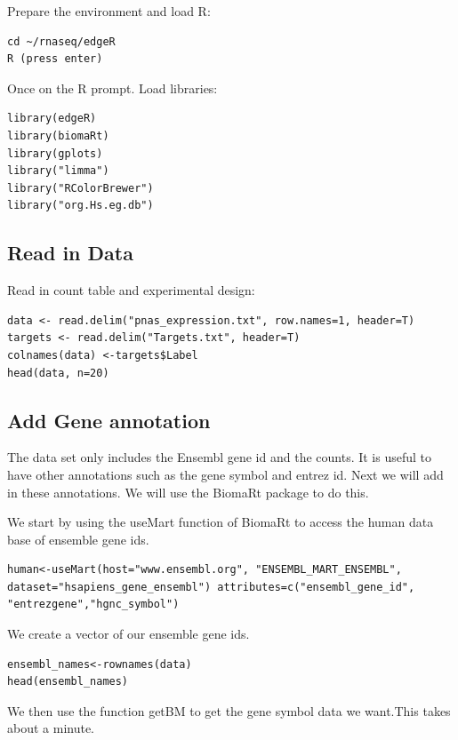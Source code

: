 \begin{steps}
Prepare the environment and load R:
\begin{lstlisting}
cd ~/rnaseq/edgeR
R (press enter)
\end{lstlisting}

Once on the R prompt. Load libraries:
\begin{lstlisting}
library(edgeR)
library(biomaRt)
library(gplots)
library("limma")
library("RColorBrewer")
library("org.Hs.eg.db")
\end{lstlisting}

\subsection{Read in Data}
Read in count table and experimental design:

\begin{steps}
\begin{lstlisting}
data <- read.delim("pnas_expression.txt", row.names=1, header=T)
targets <- read.delim("Targets.txt", header=T)
colnames(data) <-targets$Label
head(data, n=20)
\end{lstlisting}
\end{steps}

\subsection{Add Gene annotation}

The data set only includes the Ensembl gene id and the counts. It is useful to have other annotations such as the gene symbol and entrez id. Next we will add in these annotations.  We will use the BiomaRt package to do this.

\begin{steps}
We start by using the useMart function of BiomaRt to access the human data base of ensemble gene ids.  

\begin{lstlisting}
human<-useMart(host="www.ensembl.org", "ENSEMBL_MART_ENSEMBL", dataset="hsapiens_gene_ensembl") attributes=c("ensembl_gene_id", "entrezgene","hgnc_symbol")
\end{lstlisting}

We create a vector of our ensemble gene ids.
\begin{lstlisting}
ensembl_names<-rownames(data)
head(ensembl_names)
\end{lstlisting}
We then use the function getBM to get the gene symbol data we want.This takes about a minute.


\end{steps}
\end{steps}
